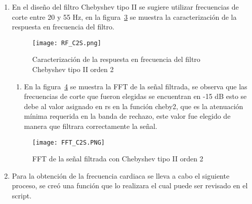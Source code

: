 \documentclass[10pt,letterpaper,spanish,twoside]{report}
\begin{document}
\begin{enumerate}
\begin{figure}[H]
	\centering
	\texttt{[image: RF\_C1S]}
	\caption{Caracterización de la Respuesta en frecuencia del filtro pasa banda\\Chebyshev tipo I orden 2}
	\label{contexto:RF_C1S}
 \end{figure}
 \begin{enumerate}
 	\item Es posible observar que las frecuencias de corte se encuentran exactamente en 23 y 45 Hz, esto es debido a que en la función cheby1 que fue utilizada se asignó un valor de rp de 3dB que es la ondulación máxima permitida por debajo de la máxima ganancia en la banda de paso.
 	\item En la figura~\ref{contexto:FFT_C1S} se muestra la FFT de la señal filtrada, es posible observar que la señal fue filtrada correctamente de acuerdo a las frecuencias de corte establecidas.
 \end{enumerate}
 \begin{figure}[H]
 	\centering
 	\texttt{[image: FFT\_C1S.PNG]}
 	\caption{FFT de la señal filtrada con filtro Chebyshev tipo I}
 	\label{contexto:FFT_C1S}
 \end{figure}
 \item En el diseño del filtro Chebyshev tipo II se sugiere utilizar frecuencias de corte entre 20 y 55 Hz, en la figura~\ref{contexto:RF_C2S} se muestra la caracterización de la respuesta en frecuencia del filtro.
 \begin{figure}[H]
 	\centering
 	\texttt{[image: RF\_C2S.png]}
 	\caption{Caracterización de la respuesta en frecuencia del filtro\\Chebyshev tipo II orden 2}
 	\label{contexto:RF_C2S} 	
 \end{figure}
 \begin{enumerate}
 	\item En la figura~\ref{contexto:FFT_C2S} se muestra la FFT de la señal filtrada, se observa que las frecuencias de corte que fueron elegidas se encuentran en -15 dB esto se debe al valor asignado en rs en la función cheby2, que es la atenuación mínima requerida en la banda de rechazo, este valor fue elegido de manera que filtrara correctamente la señal.
 \end{enumerate}
 \begin{figure}[H]
 	\centering
 	\texttt{[image: FFT\_C2S.PNG]}
 	\caption{FFT de la señal filtrada con Chebyshev tipo II orden 2}
 	\label{contexto:FFT_C2S}
 \end{figure}
 \item Para la obtención de la frecuencia cardiaca se lleva a cabo el siguiente proceso, se creó una función que lo realizara el cual puede ser revisado en el script.

\end{enumerate}
\end{document}
